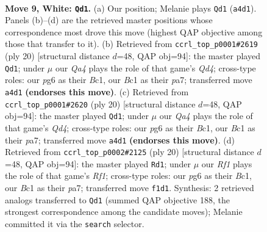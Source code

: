 \documentclass[11pt]{article}
\begin{document}
\clearpage

\begin{figure}[p]\centering
\begin{subfigure}{0.46\textwidth}\centering
\resizebox{\linewidth}{!}{%
\newchessgame
\chessboard[
  setfen={r1bq1rk1/pp1pppbp/2n2np1/2p5/Q1P5/P1N2NP1/1P1PPPBP/R1B2RK1 w - - 3 9},
  showmover=false,
  pgfstyle=straightmove, color=movearrow, markmove={a4-d1}
]}
\caption{}
\end{subfigure}\hfill
\begin{subfigure}{0.46\textwidth}\centering
\resizebox{\linewidth}{!}{%
\newchessgame
\chessboard[
  setfen={r1bqr1k1/pp1pbppp/2p2n2/2n5/2PQ4/2N2NP1/PP2PPBP/R1B2RK1 w - - 13 11},
  showmover=false,
  pgfstyle=straightmove, color=movearrow, markmove={d4-d1}
]}
\caption{}
\end{subfigure}
\\[4pt]
\begin{subfigure}{0.46\textwidth}\centering
\resizebox{\linewidth}{!}{%
\newchessgame
\chessboard[
  setfen={r1bqr1k1/pp1pbppp/2p2n2/2n5/2PQ4/2N2NP1/PP2PPBP/R1B2RK1 w - - 13 11},
  showmover=false,
  pgfstyle=straightmove, color=movearrow, markmove={d4-d1}
]}
\caption{}
\end{subfigure}\hfill
\begin{subfigure}{0.46\textwidth}\centering
\resizebox{\linewidth}{!}{%
\newchessgame
\chessboard[
  setfen={r1bqr1k1/pp1pbppp/2p2n2/2n5/2PQ4/2N2NP1/PP2PPBP/R1B2RK1 w - - 13 11},
  showmover=false,
  pgfstyle=straightmove, color=movearrow, markmove={f1-d1}
]}
\caption{}
\end{subfigure}
\caption{\textbf{Move 9, White: \texttt{Qd1}.} (a) Our position; Melanie plays \texttt{Qd1} (\texttt{a4d1}). Panels (b)--(d) are the retrieved master positions whose correspondence most drove this move (highest QAP objective among those that transfer to it). (b) Retrieved from \texttt{ccrl\_top\_p0001\#2619} (ply 20) [structural distance $d$=48, QAP obj=94]: the master played \texttt{Qd1}; under $\mu$ our \emph{Qa4} plays the role of that game's \emph{Qd4}; cross-type roles: our \emph{p}g6 as their \emph{B}c1, our \emph{B}c1 as their \emph{p}a7; transferred move \texttt{a4d1} \textbf{(endorses this move)}. (c) Retrieved from \texttt{ccrl\_top\_p0001\#2620} (ply 20) [structural distance $d$=48, QAP obj=94]: the master played \texttt{Qd1}; under $\mu$ our \emph{Qa4} plays the role of that game's \emph{Qd4}; cross-type roles: our \emph{p}g6 as their \emph{B}c1, our \emph{B}c1 as their \emph{p}a7; transferred move \texttt{a4d1} \textbf{(endorses this move)}. (d) Retrieved from \texttt{ccrl\_top\_p0002\#2125} (ply 20) [structural distance $d$=48, QAP obj=94]: the master played \texttt{Rd1}; under $\mu$ our \emph{Rf1} plays the role of that game's \emph{Rf1}; cross-type roles: our \emph{p}g6 as their \emph{B}c1, our \emph{B}c1 as their \emph{p}a7; transferred move \texttt{f1d1}. Synthesis: 2 retrieved analogs transferred to \texttt{Qd1} (summed QAP objective 188, the strongest correspondence among the candidate moves); Melanie committed it via the \texttt{search} selector.}
\label{fig:thought-m16}
\end{figure}
\end{document}
